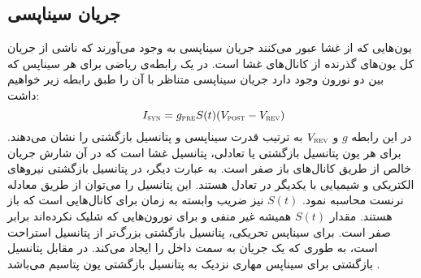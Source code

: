 \subsection{ جریان سیناپسی}
یون‌هایی که از غشا عبور می‌کنند جریان سیناپسی به وجود می‌آورند که ناشی از جریان کل یون‌های گذرنده از کانال‌های غشا است.
در یک رابطه‌ی ریاضی برای هر سیناپس که بین دو نورون وجود دارد جریان سیناپسی متناظر با آن را طبق رابطه زیر خواهیم داشت:
\begin{equation}
\ I_{\textsc{syn}} = g_{\textsc{pre}}S(t)(V_{\textsc{post}} - V_{\textsc{rev}})
\end{equation}
در این رابطه $g$  و $V_{\textsc{rev}}$ به ترتیب قدرت سیناپسی و پتانسیل بازگشتی را نشان می‌دهند. برای هر یون پتانسیل بازگشتی یا تعادلی، پتانسیل غشا است که در آن شارش جریان خالص از طریق کانال‌های باز صفر است. به عبارت دیگر، در پتانسیل بازگشتی نیرو‌های الکتریکی و شیمیایی با یکدیگر در تعادل هستند. این پتانسیل را می‌توان از طریق معادله نرنست محاسبه نمود. $S(t)$ نیز ضریب وابسته به زمان برای کانال‌‌‌هایی است که باز هستند. مقدار $S(t)$ همیشه غیر منفی و برای نورون‌هایی که شلیک نکرده‌اند برابر صفر است. برای سیناپس تحریکی، پتانسیل بازگشتی بزرگ‌تر از پتانسیل استراحت است، به طوری که یک جریان به سمت داخل را ایجاد می‌کند. در مقابل پتانسیل بازگشتی برای سیناپس مهاری نزدیک به پتانسیل بازگشتی  یون پتاسیم می‌باشد \cite{ermen}.

